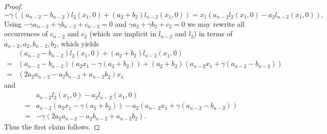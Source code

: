 \documentclass[a4paper,10pt]{amsart}
\theoremstyle{definition}
\theoremstyle{plain}
\begin{document}
\begin{proof}
 \begin{equation*}
     -\gamma((a_{n-2}-b_{n-2})l_2(x_1,0) + (a_2+b_2)l_{n-2}(x_1,0)) = x_1(a_{n-2}l_2(x_1,0) - a_2l_{n-2}(x_1,0)).
 \end{equation*}
 Using $-\gamma a_{n-2} + \gamma b_{n-2} + c_{n-2} = 0$ and $\gamma a_2 + \gamma b_2 + c_2 = 0$ we may rewrite all occurrences of $c_{n-2}$ and $c_2$ (which are implicit in $l_{n-2}$ and $l_2$) in terms of $a_{n-2},a_2,b_{n-2},b_2$, which yields
 \begin{equation*}
 \begin{split}
     &(a_{n-2} - b_{n-2})l_2(x_1,0) + (a_2 + b_2)l_{n-2}(x_1,0)  \\ =&
     (a_{n-2} - b_{n-2})(a_2x_1-\gamma(a_2+b_2)) + (a_2 + b_2)(a_{n-2}x_1 + \gamma(a_{n-2}-b_{n-2}))  \\ =&
     (2a_2a_{n-2} - a_2b_{n-2} + a_{n-2}b_2)x_1
 \end{split}
 \end{equation*}
 and
 \begin{equation*}
 \begin{split}
     &a_{n-2}l_2(x_1,0) - a_2l_{n-2}(x_1,0)  \\ =
     &a_{n-2}(a_2x_1 - \gamma(a_2+b_2)) - a_2(a_{n-2}x_1 + \gamma(a_{n-2} - b_{n-2}))  \\ =&
     - \gamma(2a_2a_{n-2} - a_2b_{n-2} + a_{n-2}b_2).
 \end{split}
 \end{equation*}
 Thus the first claim follows.


\end{proof}
\end{document}
